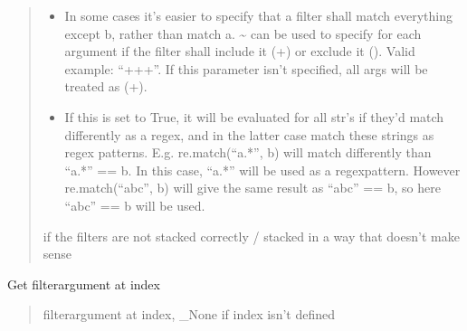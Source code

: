 \documentclass[a4paper,10pt,english]{sphinxmanual}
\begin{document}
\begin{fulllineitems}
\begin{fulllineitems}
\begin{quote}
\begin{description}
\begin{itemize}
\item {}
\sphinxAtStartPar
{} \textendash{} In some cases it’s easier to specify that a filter shall match everything except b, rather than
match a. \textasciitilde{} can be used to specify for each argument if the filter shall include it (+) or exclude it
(\sphinxhyphen{}). Valid example: “++\sphinxhyphen{}+”. If this parameter isn’t specified, all args will be treated as (+).

\item {}
\sphinxAtStartPar
{} \textendash{} If this is set to True, it will be evaluated for all str’s if they’d match differently as a
regex, and in the latter case match these strings as regex patterns. E.g. re.match(“a.*”, b) will match
differently than “a.*” == b. In this case, “a.*” will be used as a regex\sphinxhyphen{}pattern. However
re.match(“abc”, b) will give the same result as “abc” == b, so here “abc” == b will be used.

\end{itemize}

\sphinxAtStartPar
{} \textendash{} if the filters are not stacked correctly / stacked in a way that doesn’t make sense

\end{description}\end{quote}

\end{fulllineitems}


\begin{fulllineitems}
\label{\detokenize{fagus.filters:fagus.filters.KFil.__getitem__}}
\pysigstartsignatures
{}
\pysigstopsignatures
\sphinxAtStartPar
Get filter\sphinxhyphen{}argument at index
\begin{quote}\begin{description}
\sphinxAtStartPar
filter\sphinxhyphen{}argument at index, \_None if index isn’t defined

\end{description}\end{quote}


\end{fulllineitems}
\end{fulllineitems}
\end{document}
